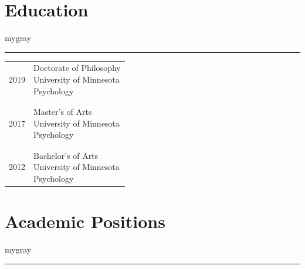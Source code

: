 \documentclass[
]{article}
\begin{document}
\vspace{1ex}

\hypertarget{education}{%
\section{\texorpdfstring{\textbf{Education}}{Education}}\label{education}}

\vspace{1ex}
\begin{color}{mygray}\hrule\end{color}
\vspace{1ex}

\begin{longtable}{p{2.25cm}p{5.5in}}
2019 & \parbox[t]{5.0in}{Doctorate of Philosophy \newline University of Minnesota \newline Psychology} \\\\& \\
2017 & \parbox[t]{5.0in}{Master's of Arts \newline University of Minnesota \newline Psychology} \\\\& \\
2012 & \parbox[t]{5.0in}{Bachelor's of Arts \newline University of Minnesota \newline Psychology} \\
\end{longtable}

\vspace{1ex}

\hypertarget{academic-positions}{%
\section{\texorpdfstring{\textbf{Academic
Positions}}{Academic Positions}}\label{academic-positions}}

\vspace{1ex}
\begin{color}{mygray}\hrule\end{color}
\vspace{1ex}
\end{document}
